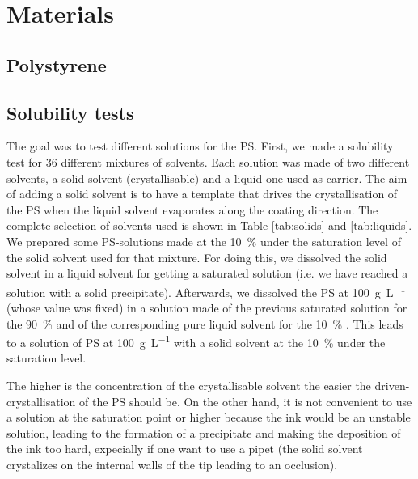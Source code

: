 \documentclass  [
  paper    = a4,
  BCOR     = 10mm,
  twoside,
  fontsize = 12pt,
  fleqn,
  toc      = bibnumbered,
  toc      = listofnumbered,
  numbers  = noendperiod,
  headings = normal,
  listof   = leveldown,
  version  = 3.03
]                                       {scrreprt}
\begin{document}
	\section{Materials}
	
		\subsection{Polystyrene}\label{sec:PS}
		
		\subsection{Solubility tests}\label{sec:solubility}
		The goal was to test different solutions for the PS. First, we made a solubility test for $36$ different mixtures of solvents. Each solution was made of two different solvents, a solid solvent (crystallisable) and a liquid one used as carrier. The aim of adding a solid solvent is to have a template that drives the crystallisation of the PS when the liquid solvent evaporates along the coating direction. The complete selection of solvents used is shown in Table \ref{tab:solids} and \ref{tab:liquids}.\\

We prepared some PS-solutions made at the \SI{10}{\percent} under the saturation level of the solid solvent used for that mixture. For doing this, we dissolved the solid solvent in a liquid solvent for getting a saturated solution (i.e. we have reached a solution with a solid precipitate). Afterwards, we dissolved the PS at \SI[per-mode=symbol]{100}{\gram\per\liter} (whose value was fixed) in a solution made of the previous saturated solution for the \SI{90}{\percent} and of the corresponding pure liquid solvent for the \SI{10}{\percent} . This leads to a solution of PS at \SI[per-mode=symbol]{100}{\gram\per\liter} with a solid solvent at the \SI{10}{\percent} under the saturation level. 

The higher is the concentration of the crystallisable solvent the easier the driven-crystallisation of the PS should be. On the other hand, it is not convenient to use a solution at the saturation point or higher because the ink would be an unstable solution, leading to the formation of a precipitate and making the deposition of the ink too hard, expecially if one want to use a pipet (the solid solvent crystalizes on the internal walls of the tip leading to an occlusion).\\
\end{document}

